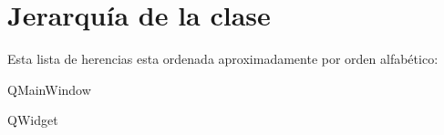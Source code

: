 \section{Jerarquía de la clase}
Esta lista de herencias esta ordenada aproximadamente por orden alfabético\-:\begin{DoxyCompactList}
\item Q\-Main\-Window\begin{DoxyCompactList}
\item {}
\item {}
\item {}
\item {}
\end{DoxyCompactList}
\item Q\-Widget\begin{DoxyCompactList}
\item {}
\end{DoxyCompactList}
\end{DoxyCompactList}
